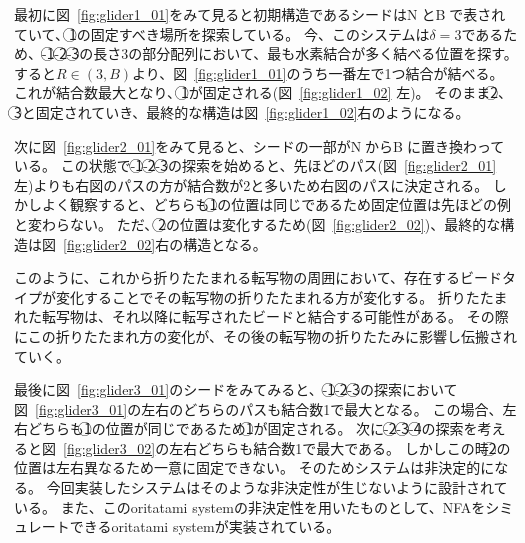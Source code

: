 \documentclass[a4,11pt]{article}
\begin{document}
最初に図~\ref{fig:glider1_01}をみて見ると初期構造であるシードは\textcircled{\scriptsize N}と\textcircled{\scriptsize B}で表されていて、\textcircled{\scriptsize 1}の固定すべき場所を探索している。
今、このシステムは$\delta =3$であるため、{-}\textcircled{\scriptsize 1}{-}\textcircled{\scriptsize 2}{-}\textcircled{\scriptsize 3}の長さ3の部分配列において、最も水素結合が多く結べる位置を探す。
すると$R \in (3,B)$より、図~\ref{fig:glider1_01}のうち一番左で1つ結合が結べる。
これが結合数最大となり、\textcircled{\scriptsize 1}が固定される(図~\ref{fig:glider1_02} 左)。
そのまま\textcircled{\scriptsize 2}、\textcircled{\scriptsize 3}と固定されていき、最終的な構造は図~\ref{fig:glider1_02}右のようになる。

次に図~\ref{fig:glider2_01}をみて見ると、シードの一部が\textcircled{\scriptsize N}から\textcircled{\scriptsize B}に置き換わっている。
この状態で{-}\textcircled{\scriptsize 1}{-}\textcircled{\scriptsize 2}{-}\textcircled{\scriptsize 3}の探索を始めると、先ほどのパス(図~\ref{fig:glider2_01} 左)よりも右図のパスの方が結合数が2と多いため右図のパスに決定される。
しかしよく観察すると、どちらも\textcircled{\scriptsize 1}の位置は同じであるため固定位置は先ほどの例と変わらない。
ただ、\textcircled{\scriptsize 2}の位置は変化するため(図~\ref{fig:glider2_02})、最終的な構造は図~\ref{fig:glider2_02}右の構造となる。

このように、これから折りたたまれる転写物の周囲において、存在するビードタイプが変化することでその転写物の折りたたまれる方が変化する。
折りたたまれた転写物は、それ以降に転写されたビードと結合する可能性がある。
その際にこの折りたたまれ方の変化が、その後の転写物の折りたたみに影響し伝搬されていく。

最後に図~\ref{fig:glider3_01}のシードをみてみると、{-}\textcircled{\scriptsize 1}{-}\textcircled{\scriptsize 2}{-}\textcircled{\scriptsize 3}の探索において図~\ref{fig:glider3_01}の左右のどちらのパスも結合数1で最大となる。
この場合、左右どちらも\textcircled{\scriptsize 1}の位置が同じであるため\textcircled{\scriptsize 1}が固定される。
次に{-}\textcircled{\scriptsize 2}{-}\textcircled{\scriptsize 3}{-}\textcircled{\scriptsize 4}の探索を考えると図~\ref{fig:glider3_02}の左右どちらも結合数1で最大である。
しかしこの時\textcircled{\scriptsize 2}の位置は左右異なるため一意に固定できない。
そのためシステムは非決定的になる。
今回実装したシステムはそのような非決定性が生じないように設計されている。
また、このoritatami systemの非決定性を用いたものとして、NFAをシミュレートできるoritatami systemが実装されている\cite{nfaoritatami}。
\end{document}
